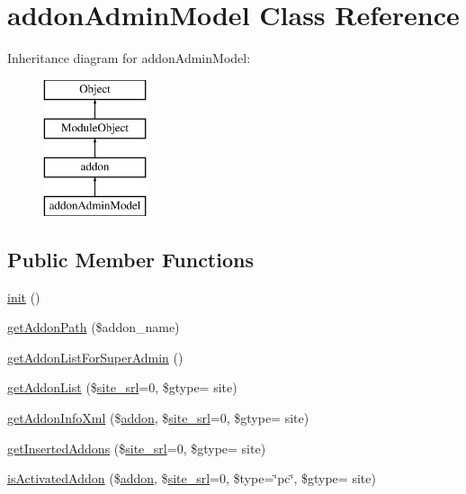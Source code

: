 \hypertarget{classaddonAdminModel}{}\section{addon\+Admin\+Model Class Reference}
\label{classaddonAdminModel}
Inheritance diagram for addon\+Admin\+Model\+:\begin{figure}[H]
\begin{center}
\leavevmode
\includegraphics[height=4.000000cm]{classaddonAdminModel}
\end{center}
\end{figure}
\subsection*{Public Member Functions}
\begin{DoxyCompactItemize}
\item 
\hyperlink{classaddonAdminModel_aed6091be1c24a8c5fcf101b664300b00}{init} ()
\item 
\hyperlink{classaddonAdminModel_ab4fea679a0059be718e449b31a88c46f}{get\+Addon\+Path} (\$addon\+\_\+name)
\item 
\hyperlink{classaddonAdminModel_a056c3d3567ae957b9a5635397dd78b9e}{get\+Addon\+List\+For\+Super\+Admin} ()
\item 
\hyperlink{classaddonAdminModel_abd8052e647a7ea4224e0680663fca536}{get\+Addon\+List} (\$\hyperlink{ko_8install_8php_a8b1406b4ad1048041558dce6bfe89004}{site\+\_\+srl}=0, \$gtype= \textquotesingle{}site\textquotesingle{})
\item 
\hyperlink{classaddonAdminModel_a9019b55b1c67ac658259bfd78bd74e4a}{get\+Addon\+Info\+Xml} (\$\hyperlink{classaddon}{addon}, \$\hyperlink{ko_8install_8php_a8b1406b4ad1048041558dce6bfe89004}{site\+\_\+srl}=0, \$gtype= \textquotesingle{}site\textquotesingle{})
\item 
\hyperlink{classaddonAdminModel_a59cd95bf540c78d29043029f292c201b}{get\+Inserted\+Addons} (\$\hyperlink{ko_8install_8php_a8b1406b4ad1048041558dce6bfe89004}{site\+\_\+srl}=0, \$gtype= \textquotesingle{}site\textquotesingle{})
\item 
\hyperlink{classaddonAdminModel_ac5b47c66d9e5d0daea7e857676f2b7ec}{is\+Activated\+Addon} (\$\hyperlink{classaddon}{addon}, \$\hyperlink{ko_8install_8php_a8b1406b4ad1048041558dce6bfe89004}{site\+\_\+srl}=0, \$type=\char`\"{}pc\char`\"{}, \$gtype= \textquotesingle{}site\textquotesingle{})
\end{DoxyCompactItemize}
